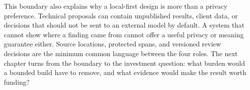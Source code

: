 This boundary also explains why a local-first design is more than a privacy
preference. Technical proposals can contain unpublished results, client data,
or decisions that should not be sent to an external model by default. A system
that cannot show where a finding came from cannot offer a useful privacy or
meaning guarantee either. Source locations, protected spans, and versioned
review decisions are the minimum common language between the four roles. The
next chapter turns from the boundary to the investment question: what burden
would a bounded build have to remove, and what evidence would make the result
worth funding?
